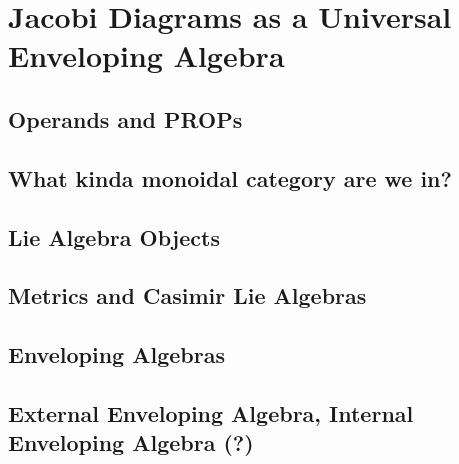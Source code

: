 \chapter{Jacobi Diagrams as a Universal Enveloping Algebra}
\label{ch:jacobi-diagrams-as-a-universal-enveloping-algebra}


\section{Operands and PROPs}

\section{What kinda monoidal category are we in?}

\section{Lie Algebra Objects}

\section{Metrics and Casimir Lie Algebras}

\section{Enveloping Algebras}

\section{External Enveloping Algebra, Internal Enveloping Algebra (?)}

